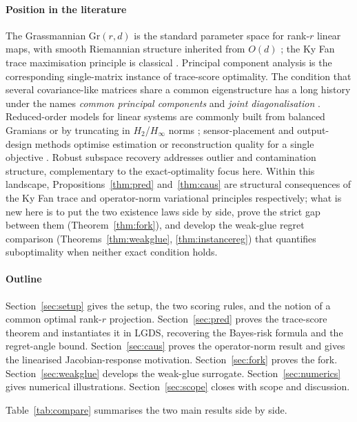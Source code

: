 \documentclass[final,3p,times]{elsarticle}
\newcommand{\Gr}{\mathrm{Gr}}
\begin{document}
\paragraph{Position in the literature}
The Grassmannian $\Gr(r,d)$ is the standard parameter space for rank-$r$
linear maps, with smooth Riemannian structure inherited from $O(d)$
\cite{Edelman1998}; the Ky Fan trace maximisation principle is classical
\cite{Fan1949,HornJohnson2013}.
Principal component analysis \cite{Hotelling1933} is the corresponding
single-matrix instance of trace-score optimality.
The condition that several covariance-like matrices share a common
eigenstructure has a long history under the names \emph{common principal
components} \cite{Flury1984,Krzanowski1979} and \emph{joint
diagonalisation} \cite{Pham2001}.
Reduced-order models for linear systems are commonly built from balanced
Gramians \cite{Moore1981} or by truncating in $H_2$/$H_\infty$ norms
\cite{Antoulas2005}; sensor-placement and output-design methods optimise
estimation or reconstruction quality for a single objective
\cite{JoshiBoyd2009}.
Robust subspace recovery \cite{LermanMaunu2018} addresses outlier and
contamination structure, complementary to the exact-optimality focus
here.
Within this landscape, Propositions~\ref{thm:pred} and~\ref{thm:caus} are
structural consequences of the Ky Fan trace and operator-norm variational
principles respectively; what is new here is to put the two existence
laws side by side, prove the strict gap between them
(Theorem~\ref{thm:fork}), and develop the weak-glue regret comparison
(Theorems~\ref{thm:weakglue}, \ref{thm:instancereg}) that quantifies
suboptimality when neither exact condition holds.

\paragraph{Outline}
Section~\ref{sec:setup} gives the setup, the two scoring rules, and the
notion of a common optimal rank-$r$ projection.
Section~\ref{sec:pred} proves the trace-score theorem and instantiates
it in LGDS, recovering the Bayes-risk formula and the regret-angle bound.
Section~\ref{sec:caus} proves the operator-norm result and gives the
linearised Jacobian-response motivation.
Section~\ref{sec:fork} proves the fork.
Section~\ref{sec:weakglue} develops the weak-glue surrogate.
Section~\ref{sec:numerics} gives numerical illustrations.
Section~\ref{sec:scope} closes with scope and discussion.

Table~\ref{tab:compare} summarises the two main results side by side.
\end{document}
